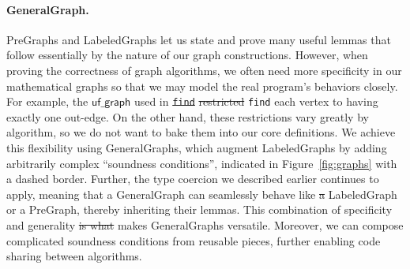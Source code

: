 \documentclass[acmsmall,screen]{acmart}  %
\newcommand{\li}[1]{{\texttt{\small #1}}} %
\newcommand{\p}[1]{\ensuremath{\mathsf{#1}}} \newcommand{\m}[1]{\ensuremath{\mathit{#1}}} \newcommand{\ma}[1]{\ensuremath{\mathcal{#1}}} \let\ramify\lightning
\providecommand{\DIFadd}[1]{{\protect\color{blue}\uwave{#1}}} %
\providecommand{\DIFdel}[1]{{\protect\color{red}\sout{#1}}}                      %
\providecommand{\DIFaddbegin}{} %
\providecommand{\DIFaddend}{} %
\providecommand{\DIFdelbegin}{} %
\providecommand{\DIFdelend}{} %
\newcommand{\DIFscaledelfig}{0.5}
\newlength{\DIFdelgraphicswidth} %
\newlength{\DIFdelgraphicsheight} %
\newcommand{\DIFaddincludegraphics}[2][]{{\color{blue}\fbox{\DIFOincludegraphics[#1]{#2}}}} %
\newcommand{\DIFdelincludegraphics}[2][]{%
\sbox{\DIFdelgraphicsbox}{\DIFOincludegraphics[#1]{#2}}%
\settoboxwidth{\DIFdelgraphicswidth}{\DIFdelgraphicsbox} %
\settoboxtotalheight{\DIFdelgraphicsheight}{\DIFdelgraphicsbox} %
\scalebox{\DIFscaledelfig}{%
\parbox[b]{\DIFdelgraphicswidth}{\usebox{\DIFdelgraphicsbox}\\[-\baselineskip] \rule{\DIFdelgraphicswidth}{0em}}\llap{\resizebox{\DIFdelgraphicswidth}{\DIFdelgraphicsheight}{%
\setlength{\unitlength}{\DIFdelgraphicswidth}%
\begin{picture}(1,1)%
\thicklines\linethickness{2pt} %
{\color[rgb]{1,0,0}\put(0,0){\framebox(1,1){}}}%
{\color[rgb]{1,0,0}\put(0,0){\line( 1,1){1}}}%
{\color[rgb]{1,0,0}\put(0,1){\line(1,-1){1}}}%
\end{picture}%
}\hspace*{3pt}}} %
} %
\DeclareRobustCommand{\DIFaddbegin}{\DIFOaddbegin \let\includegraphics\DIFaddincludegraphics} %
\DeclareRobustCommand{\DIFaddend}{\DIFOaddend \let\includegraphics\DIFOincludegraphics} %
\DeclareRobustCommand{\DIFdelbegin}{\DIFOdelbegin \let\includegraphics\DIFdelincludegraphics} %
\DeclareRobustCommand{\DIFdelend}{\DIFOaddend \let\includegraphics\DIFOincludegraphics} %
\begin{document}
\paragraph{GeneralGraph.}
PreGraphs and LabeledGraphs let us state
and prove many useful lemmas that follow essentially by the nature
of our graph constructions. However, when proving the correctness of graph
algorithms, we often need more specificity in our mathematical graphs
so that we may model the real program's behaviors closely.
For example, the \p{uf\_graph} used in \DIFdelbegin \texttt{\DIFdel{find}}
\DIFdel{restricted }\DIFdelend \DIFaddbegin \li{find}
\DIFadd{restricts }\DIFaddend each vertex to having exactly one out-edge.
On the other hand, these restrictions vary greatly by algorithm, so we do not
want to bake them into our core definitions.
We achieve this flexibility using GeneralGraphs, which augment
LabeledGraphs by adding arbitrarily complex ``soundness conditions'', indicated in
Figure~\ref{fig:graphs} with a dashed border.
Further, the type coercion we described earlier continues to apply,
meaning that a GeneralGraph can seamlessly behave like \DIFdelbegin \DIFdel{a
}\DIFdelend \DIFaddbegin \DIFadd{its internal
}\DIFaddend LabeledGraph or a PreGraph, thereby inheriting their lemmas.
This combination of specificity and generality
\DIFdelbegin \DIFdel{is
what }\DIFdelend makes GeneralGraphs versatile. Moreover, we can
compose complicated soundness conditions from reusable pieces,
further enabling code sharing between algorithms.
\end{document}
